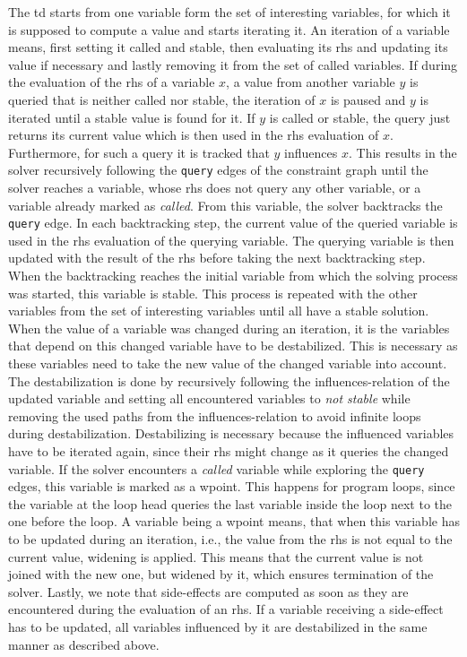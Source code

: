   The \ac{td} starts from one variable form the set of interesting variables, for which it is supposed to compute a value and starts iterating it. An iteration of a variable means, first setting it called and stable, then evaluating its \ac{rhs} and updating its value if necessary and lastly removing it from the set of called variables. If during the evaluation of the \ac{rhs} of a variable $x$, a value from another variable $y$ is queried that is neither called nor stable, the iteration of $x$ is paused and $y$ is iterated until a stable value is found for it. If $y$ is called or stable, the query just returns its current value which is then used in the \ac{rhs} evaluation of $x$. Furthermore, for such a query it is tracked that $y$ influences $x$. This results in the solver recursively following the \texttt{query} edges of the constraint graph until the solver reaches a variable, whose \ac{rhs} does not query any other variable, or a variable already marked as \textit{called}. From this variable, the solver backtracks the \texttt{query} edge. In each backtracking step, the current value of the queried variable is used in the \ac{rhs} evaluation of the querying variable. The querying variable is then updated with the result of the \ac{rhs} before taking the next backtracking step. When the backtracking reaches the initial variable from which the solving process was started, this variable is stable. This process is repeated with the other variables from the set of interesting variables until all have a stable solution.
  When the value of a variable was changed during an iteration, it is the variables that depend on this changed variable have to be destabilized. This is necessary as these variables need to take the new value of the changed variable into account. The destabilization is done by recursively following the influences-relation of the updated variable and setting all encountered variables to \textit{not stable} while removing the used paths from the influences-relation to avoid infinite loops during destabilization. Destabilizing is necessary because the influenced variables have to be iterated again, since their \ac{rhs} might change as it queries the changed variable.
  If the solver encounters a \textit{called} variable while exploring the \texttt{query} edges, this variable is marked as a wpoint. This happens for program loops, since the variable at the loop head queries the last variable inside the loop next to the one before the loop. A variable being a wpoint means, that when this variable has to be updated during an iteration, i.e., the value from the \ac{rhs} is not equal to the current value, widening is applied. This means that the current value is not joined with the new one, but widened by it, which ensures termination of the solver. 
  Lastly, we note that side-effects are computed as soon as they are encountered during the evaluation of an \ac{rhs}. If a variable receiving a side-effect has to be updated, all variables influenced by it are destabilized in the same manner as described above.
